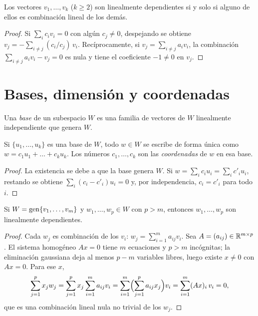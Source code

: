 \begin{proposicion}\label{prop:dependencia}
Los vectores $v_1,\dots,v_k$ ($k\ge 2$) son linealmente dependientes si y solo si alguno de ellos es combinación lineal de los demás.
\end{proposicion}

\begin{proof}
Si $\sum_i c_iv_i=0$ con algún $c_j\ne 0$, despejando se obtiene $v_j=-\sum_{i\ne j}(c_i/c_j)\,v_i$. Recíprocamente, si $v_j=\sum_{i\ne j}a_iv_i$, la combinación $\sum_{i\ne j}a_iv_i-v_j=0$ es nula y tiene el coeficiente $-1\ne 0$ en $v_j$.
\end{proof}

\section{Bases, dimensión y coordenadas}

\begin{definicion}[Base]
Una \emph{base} de un subespacio $W$ es una familia de vectores de $W$ linealmente independiente que genera $W$.
\end{definicion}

\begin{proposicion}[Coordenadas]\label{prop:coordenadas}
Si $\{u_1,\dots,u_k\}$ es una base de $W$, todo $w\in W$ se escribe de forma única como $w=c_1u_1+\dots+c_ku_k$. Los números $c_1,\dots,c_k$ son las \emph{coordenadas} de $w$ en esa base.
\end{proposicion}

\begin{proof}
La existencia se debe a que la base genera $W$. Si $w=\sum_i c_iu_i=\sum_i c'_iu_i$, restando se obtiene $\sum_i(c_i-c'_i)u_i=0$ y, por independencia, $c_i=c'_i$ para todo $i$.
\end{proof}

\begin{lema}\label{lem:steinitz}
Si $W=\operatorname{gen}\{v_1,\dots,v_m\}$ y $w_1,\dots,w_p\in W$ con $p>m$, entonces $w_1,\dots,w_p$ son linealmente dependientes.
\end{lema}

\begin{proof}
Cada $w_j$ es combinación de los $v_i$: $w_j=\sum_{i=1}^{m}a_{ij}v_i$. Sea $A=(a_{ij})\in\mathbb{R}^{m\times p}$. El sistema homogéneo $Ax=0$ tiene $m$ ecuaciones y $p>m$ incógnitas; la eliminación gaussiana deja al menos $p-m$ variables libres, luego existe $x\ne 0$ con $Ax=0$. Para ese $x$,
\[
\sum_{j=1}^{p}x_jw_j=\sum_{j=1}^{p}x_j\sum_{i=1}^{m}a_{ij}v_i=\sum_{i=1}^{m}\Bigl(\sum_{j=1}^{p}a_{ij}x_j\Bigr)v_i=\sum_{i=1}^{m}(Ax)_i\,v_i=0,
\]
que es una combinación lineal nula no trivial de los $w_j$.
\end{proof}

